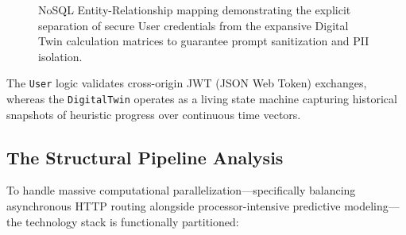 \documentclass[conference]{IEEEtran}
\begin{document}
\begin{figure}[!ht]
\centering
{}
\caption{NoSQL Entity-Relationship mapping demonstrating the explicit separation of secure User credentials from the expansive Digital Twin calculation matrices to guarantee prompt sanitization and PII isolation.}
\label{fig:erdiagram}
\end{figure}

The \texttt{User} logic validates cross-origin JWT (JSON Web Token) exchanges, whereas the \texttt{DigitalTwin} operates as a living state machine capturing historical snapshots of heuristic progress over continuous time vectors.

\subsection{The Structural Pipeline Analysis}
To handle massive computational parallelization---specifically balancing asynchronous HTTP routing alongside processor-intensive predictive modeling---the technology stack is functionally partitioned:
\end{document}
